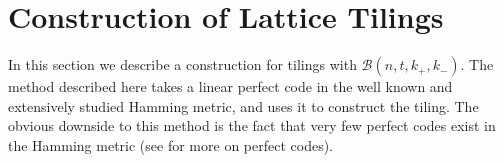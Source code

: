 \documentclass[sort&compress]{elsarticle}
\newcommand{\cG}{\mathcal{G}}
\newcommand{\cK}{\mathcal{K}}
\renewcommand{\leq}{\leqslant}
\newtheorem{theorem}{Theorem}
\newcommand{\R}{\mathbb{R}}
\newcommand{\Z}{\mathbb{Z}}
\newcommand{\va}{\mathbf{a}}
\newcommand{\vb}{\mathbf{b}}
\newcommand{\kp}{k_+}
\newcommand{\km}{k_-}
\newcommand{\BALL}{{\mathcal B}(n,t,\kp,\km)}
\newcommand{\eqdef}{\triangleq}
\begin{document}
\section{Construction of Lattice Tilings}
\label{sec:tiling}

In this section we describe a construction for tilings with
$\BALL$. The method described here takes a linear perfect code in the
well known and extensively studied Hamming metric, and uses it to
construct the tiling. The obvious downside to this method is the fact
that very few perfect codes exist in the Hamming metric (see
\cite{MacSlo78} for more on perfect codes).



 


\end{document}
